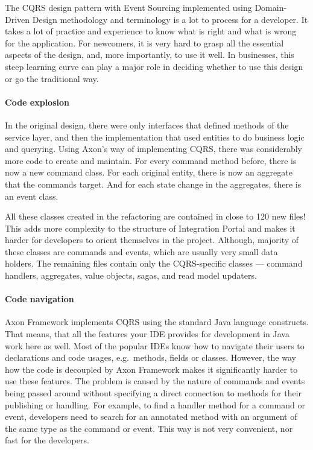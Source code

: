 \documentclass{book}
\begin{document}
The CQRS design pattern with Event Sourcing implemented using
Domain-Driven Design methodology and terminology is a lot to process for
a developer. It takes a lot of practice and experience to know what is
right and what is wrong for the application. For newcomers, it is very
hard to grasp all the essential aspects of the design, and, more
importantly, to use it well. In businesses, this steep learning curve
can play a major role in deciding whether to use this design or go the
traditional way.

\paragraph{Code explosion}\label{code-explosion}

In the original design, there were only interfaces that defined methods
of the service layer, and then the implementation that used entities to
do business logic and querying. Using Axon's way of implementing CQRS,
there was considerably more code to create and maintain. For every
command method before, there is now a new command class. For each
original entity, there is now an aggregate that the commands target. And
for each state change in the aggregates, there is an event class.

All these classes created in the refactoring are contained in close to
120 new files! This adds more complexity to the structure of Integration
Portal and makes it harder for developers to orient themselves in the
project. Although, majority of these classes are commands and events,
which are usually very small data holders. The remaining files contain
only the CQRS-specific classes --- command handlers, aggregates, value
objects, sagas, and read model updaters.

\paragraph{Code navigation}\label{code-navigation}

Axon Framework implements CQRS using the standard Java language
constructs. That means, that all the features your IDE provides for
development in Java work here as well. Most of the popular IDEs know how
to navigate their users to declarations and code usages, e.g.~methods,
fields or classes. However, the way how the code is decoupled by Axon
Framework makes it significantly harder to use these features. The
problem is caused by the nature of commands and events being passed
around without specifying a direct connection to methods for their
publishing or handling. For example, to find a handler method for a
command or event, developers need to search for an annotated method with
an argument of the same type as the command or event. This way is not
very convenient, nor fast for the developers.
\end{document}
